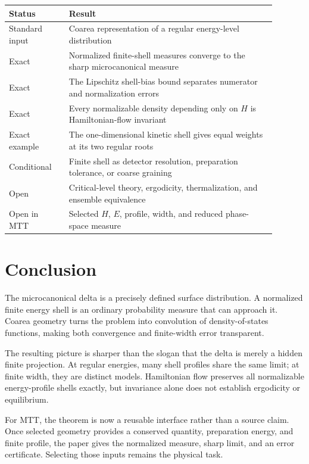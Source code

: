 \documentclass[11pt]{article}
\begin{document}
\begin{center}
\begin{tabular}{p{0.20\linewidth}p{0.69\linewidth}}
\toprule
Status & Result\\
\midrule
Standard input &
Coarea representation of a regular energy-level distribution\\
Exact &
Normalized finite-shell measures converge to the sharp microcanonical measure\\
Exact &
The Lipschitz shell-bias bound separates numerator and normalization errors\\
Exact &
Every normalizable density depending only on \(H\) is Hamiltonian-flow
invariant\\
Exact example &
The one-dimensional kinetic shell gives equal weights at its two regular roots\\
Conditional &
Finite shell as detector resolution, preparation tolerance, or coarse graining\\
Open &
Critical-level theory, ergodicity, thermalization, and ensemble equivalence\\
Open in MTT &
Selected \(H\), \(E\), profile, width, and reduced phase-space measure\\
\bottomrule
\end{tabular}
\end{center}

\section{Conclusion}

The microcanonical delta is a precisely defined surface distribution. A
normalized finite energy shell is an ordinary probability measure that can
approach it. Coarea geometry turns the problem into convolution of
density-of-states functions, making both convergence and finite-width error
transparent.

The resulting picture is sharper than the slogan that the delta is merely a
hidden finite projection. At regular energies, many shell profiles share the
same limit; at finite width, they are distinct models. Hamiltonian flow
preserves all normalizable energy-profile shells exactly, but invariance alone
does not establish ergodicity or equilibrium.

For MTT, the theorem is now a reusable interface rather than a source claim.
Once selected geometry provides a conserved quantity, preparation energy, and
finite profile, the paper gives the normalized measure, sharp limit, and an
error certificate. Selecting those inputs remains the physical task.
\end{document}
